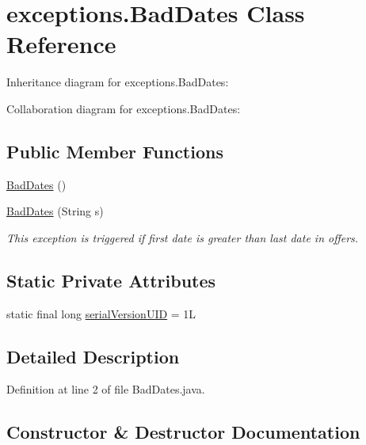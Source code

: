 \hypertarget{classexceptions_1_1BadDates}{}\section{exceptions.\+Bad\+Dates Class Reference}
\label{classexceptions_1_1BadDates}


Inheritance diagram for exceptions.\+Bad\+Dates\+:


Collaboration diagram for exceptions.\+Bad\+Dates\+:
\subsection*{Public Member Functions}
\begin{DoxyCompactItemize}
\item 
\mbox{\hyperlink{classexceptions_1_1BadDates_ad4918ff10b5e46df93774ea9087e6d04}{Bad\+Dates}} ()
\item 
\mbox{\hyperlink{classexceptions_1_1BadDates_a34213c984892e85612e3a2e44220e896}{Bad\+Dates}} (String s)
\begin{DoxyCompactList}\small\item\em This exception is triggered if first date is greater than last date in offers. \end{DoxyCompactList}\end{DoxyCompactItemize}
\subsection*{Static Private Attributes}
\begin{DoxyCompactItemize}
\item 
static final long \mbox{\hyperlink{classexceptions_1_1BadDates_a1703e41273cdde53ece45e307839c449}{serial\+Version\+U\+ID}} = 1L
\end{DoxyCompactItemize}


\subsection{Detailed Description}


Definition at line 2 of file Bad\+Dates.\+java.



\subsection{Constructor \& Destructor Documentation}
\mbox{\label{classexceptions_1_1BadDates_ad4918ff10b5e46df93774ea9087e6d04}} 
